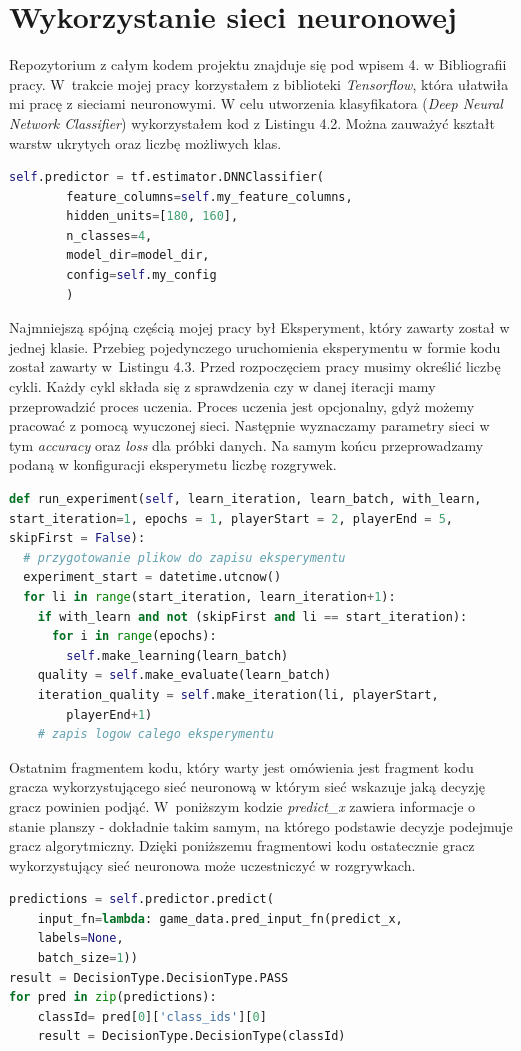 \documentclass[12pt, oneside]{report}
\begin{document}
\section{Wykorzystanie sieci neuronowej}
Repozytorium z całym kodem projektu znajduje się pod wpisem 4. w Bibliografii pracy.
W~trakcie mojej pracy korzystałem z biblioteki \textit{Tensorflow}, która ułatwiła mi pracę z sieciami 
neuronowymi. W celu utworzenia klasyfikatora (\textit{Deep Neural Network Classifier}) wykorzystałem kod z Listingu 4.2. Można zauważyć kształt warstw ukrytych oraz liczbę możliwych klas.

\begin{lstlisting}[frame=single, language=Python, caption=Konfiguracja klasyfikatora]
 self.predictor = tf.estimator.DNNClassifier(
		feature_columns=self.my_feature_columns,
		hidden_units=[180, 160],
		n_classes=4,
		model_dir=model_dir,
		config=self.my_config
		)
\end{lstlisting}

Najmniejszą spójną częścią mojej pracy był Eksperyment, który zawarty został w jednej klasie. Przebieg pojedynczego uruchomienia eksperymentu w formie kodu został zawarty w~Listingu 4.3. Przed rozpoczęciem pracy musimy określić liczbę cykli. Każdy cykl składa się z sprawdzenia czy w danej iteracji mamy przeprowadzić proces uczenia. Proces uczenia jest opcjonalny, gdyż możemy pracować z pomocą wyuczonej sieci. Następnie wyznaczamy parametry sieci w tym \textit{accuracy} oraz \textit{loss} dla próbki danych. Na samym końcu przeprowadzamy podaną w konfiguracji eksperymetu liczbę rozgrywek. 
\begin{lstlisting}[frame=single, language=Python, caption=Funkcja przeprowadzająca pojedynczy eksperyment]
def run_experiment(self, learn_iteration, learn_batch, with_learn, 
start_iteration=1, epochs = 1, playerStart = 2, playerEnd = 5, 
skipFirst = False):
  # przygotowanie plikow do zapisu eksperymentu
  experiment_start = datetime.utcnow()
  for li in range(start_iteration, learn_iteration+1):
    if with_learn and not (skipFirst and li == start_iteration):
      for i in range(epochs):
        self.make_learning(learn_batch)
    quality = self.make_evaluate(learn_batch)
    iteration_quality = self.make_iteration(li, playerStart,
		playerEnd+1)
    # zapis logow calego eksperymentu
\end{lstlisting}

Ostatnim fragmentem kodu, który warty jest omówienia jest fragment kodu gracza wykorzystującego sieć neuronową w którym sieć wskazuje jaką decyzję gracz powinien podjąć. W~poniższym kodzie \textit{predict\_x} zawiera informacje o stanie planszy - dokładnie takim samym, na którego podstawie decyzje podejmuje gracz algorytmiczny. Dzięki poniższemu fragmentowi kodu ostatecznie gracz wykorzystujący sieć neuronowa może uczestniczyć w rozgrywkach. 
\begin{lstlisting}[frame=single, language=Python, caption=Wyznaczenie klasy decyzji]
predictions = self.predictor.predict(
	input_fn=lambda: game_data.pred_input_fn(predict_x,
	labels=None,
	batch_size=1))
result = DecisionType.DecisionType.PASS
for pred in zip(predictions):
	classId= pred[0]['class_ids'][0]
	result = DecisionType.DecisionType(classId)
\end{lstlisting}
\end{document}
